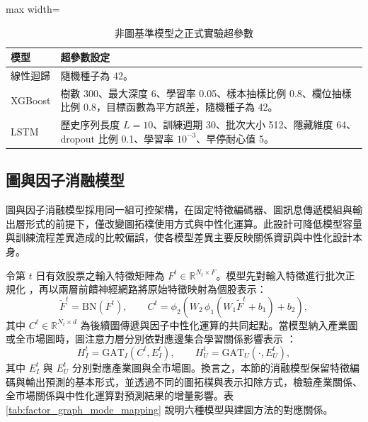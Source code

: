 \begin{table}[H]
\centering
\caption{非圖基準模型之正式實驗超參數}
\label{tab:baseline_model_hyperparameters}
\small
\begin{adjustbox}{max width=\textwidth}
\begin{tabular}{p{2.2cm} p{12.5cm}}
\toprule
模型 & 超參數設定 \\
\midrule
線性迴歸 & 隨機種子為 42。 \\
XGBoost & 樹數 300、最大深度 6、學習率 0.05、樣本抽樣比例 0.8、欄位抽樣比例 0.8，目標函數為平方誤差，隨機種子為 42。 \\
LSTM & 歷史序列長度 \(L=10\)、訓練週期 30、批次大小 512、隱藏維度 64、dropout 比例 0.1、學習率 \(10^{-3}\)、早停耐心值 5。 \\
\bottomrule
\end{tabular}
\end{adjustbox}
\end{table}
\FloatBarrier

\subsection{圖與因子消融模型}
\label{subsec:factor_ablation_models}

圖與因子消融模型採用同一組可控架構，在固定特徵編碼器、圖訊息傳遞模組與輸出層形式的前提下，僅改變圖拓樸使用方式與中性化運算。此設計可降低模型容量與訓練流程差異造成的比較偏誤，使各模型差異主要反映關係資訊與中性化設計本身。

令第 \(t\) 日有效股票之輸入特徵矩陣為 \(F^t \in \mathbb{R}^{N_t \times F}\)。模型先對輸入特徵進行批次正規化 \cite{ioffe2015batchnorm}，再以兩層前饋神經網路將原始特徵映射為個股表示：
\begin{equation}
\widetilde{F}^{t}=\mathrm{BN}(F^t), \qquad
C^t=\phi_2\!\left(W_2\,\phi_1(W_1\widetilde{F}^{t}+b_1)+b_2\right),
\end{equation}
其中 \(C^t \in \mathbb{R}^{N_t \times d}\) 為後續圖傳遞與因子中性化運算的共同起點。當模型納入產業圖或全市場圖時，圖注意力層分別依對應邊集合學習關係影響表示 \cite{velickovic2018gat}：
\begin{equation}
H_I^t = \mathrm{GAT}_{I}(C^t, E_I^t), \qquad
H_U^t = \mathrm{GAT}_{U}(\cdot, E_U^t),
\end{equation}
其中 \(E_I^t\) 與 \(E_U^t\) 分別對應產業圖與全市場圖。換言之，本節的消融模型保留特徵編碼與輸出預測的基本形式，並透過不同的圖拓樸與表示扣除方式，檢驗產業關係、全市場關係與中性化運算對預測結果的增量影響。表 \ref{tab:factor_graph_mode_mapping} 說明六種模型與建圖方法的對應關係。

